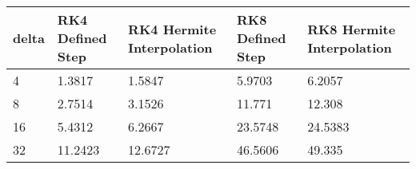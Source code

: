\begin{tabular}{lllll}
delta & RK4 Defined Step & RK4 Hermite Interpolation & RK8 Defined Step & RK8 Hermite Interpolation \\ 
\hline 
4 & 1.3817 & 1.5847 & 5.9703 & 6.2057 \\ 
8 & 2.7514 & 3.1526 & 11.771 & 12.308 \\ 
16 & 5.4312 & 6.2667 & 23.5748 & 24.5383 \\ 
32 & 11.2423 & 12.6727 & 46.5606 & 49.335 \\ 
\hline 
\end{tabular}